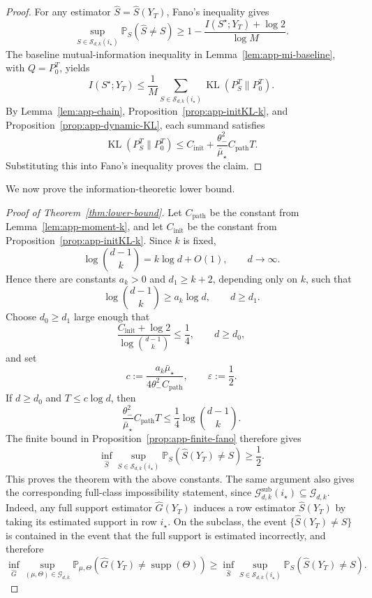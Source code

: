 \documentclass{article}
\newcommand{\KL}{\operatorname{KL}}
\newcommand{\thetalo}{\theta_-}
\newcommand{\Pbb}{\mathbb{P}}
\newcommand{\supp}{\operatorname{supp}}
\begin{document}
\begin{proof}
For any estimator $\widehat S=\widehat S(Y_T)$, Fano's inequality gives
\[
\sup_{S\in\mathcal S_{d,k}(i_\star)}\Pbb_S(\widehat S\neq S)
\ge
1-\frac{I(S^\star;Y_T)+\log 2}{\log M}.
\]
The baseline mutual-information inequality in Lemma~\ref{lem:app-mi-baseline},
with $Q=P_0^T$, yields
\[
I(S^\star;Y_T)
\le \frac1M\sum_{S\in\mathcal S_{d,k}(i_\star)}\KL(P_S^T\|P_0^T).
\]
By Lemma~\ref{lem:app-chain}, Proposition~\ref{prop:app-initKL-k}, and
Proposition~\ref{prop:app-dynamic-KL}, each summand satisfies
\[
\KL(P_S^T\|P_0^T)
\le C_{\mathrm{init}}+\frac{\thetalo^2}{\bar\mu_\star}C_{\mathrm{path}}T.
\]
Substituting this into Fano's inequality proves the claim.

\end{proof}
We now prove the information-theoretic lower bound.
\begin{proof}[Proof of Theorem~\ref{thm:lower-bound}]

Let \(C_{\mathrm{path}}\) be the constant from Lemma~\ref{lem:app-moment-k}, and let
\(C_{\mathrm{init}}\) be the constant from Proposition~\ref{prop:app-initKL-k}.
Since $k$ is fixed,
\[
\log\binom{d-1}{k}=k\log d+O(1),\qquad d\to\infty.
\]
Hence there are constants $a_k>0$ and $d_1\ge k+2$, depending only on $k$, such
that
\[
\log\binom{d-1}{k}\ge a_k\log d,\qquad d\ge d_1.
\]
Choose $d_0\ge d_1$ large enough that
\[
\frac{C_{\mathrm{init}}+\log 2}{\log\binom{d-1}{k}}\le \frac14,
\qquad d\ge d_0,
\]
and set
\[
c:=\frac{a_k\bar\mu_\star}{4\thetalo^2 C_{\mathrm{path}}},
\qquad \varepsilon:=\frac12.
\]
If $d\ge d_0$ and $T\le c\log d$, then
\[
\frac{\thetalo^2}{\bar\mu_\star}C_{\mathrm{path}}T
\le \frac14\log\binom{d-1}{k}.
\]
The finite bound in Proposition~\ref{prop:app-finite-fano} therefore gives
\[
\inf_{\widehat S}\sup_{S\in\mathcal S_{d,k}(i_\star)}
\Pbb_S(\widehat S(Y_T)\neq S)
\ge \frac12.
\]
This proves the theorem with the above constants. 
The same argument also gives the
corresponding full-class impossibility statement, since $\mathcal G_{d,k}^{\mathrm{sub}}(i_\star)\subseteq\mathcal G_{d,k}$. Indeed, any full support estimator $\widehat G(Y_T)$ induces
a row estimator $\widehat S(Y_T)$ by taking its estimated support in row
$i_\star$. On the subclass, the event $\{ \widehat S(Y_T)\ne S \}$ is contained
in the event that the full support is estimated incorrectly, and therefore
\[
\inf_{\widehat G}
\sup_{(\mu,\Theta)\in\mathcal G_{d,k}}
\Pbb_{\mu,\Theta}\!\left(\widehat G(Y_T)\ne \supp(\Theta)\right)
\ge
\inf_{\widehat S}
\sup_{S\in\mathcal S_{d,k}(i_\star)}
\Pbb_S\!\left(\widehat S(Y_T)\ne S\right).
\]
\end{proof}

\end{document}
